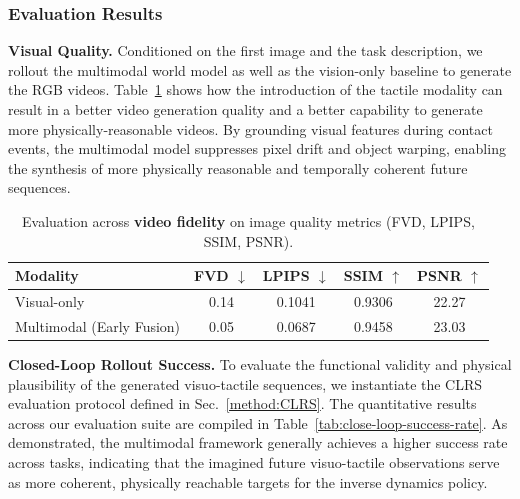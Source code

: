 \documentclass{article}
\begin{document}
\subsubsection{Evaluation Results}

\textbf{Visual Quality.} Conditioned on the first image and the task description, we rollout the multimodal world model as well as the vision-only baseline to generate the RGB videos. Table~\ref{tab:visual-quality} shows how the introduction of the tactile modality can result in a better video generation quality and a better capability to generate more physically-reasonable videos. By grounding visual features during contact events, the multimodal model suppresses pixel drift and object warping, enabling the synthesis of more physically reasonable and temporally coherent future sequences.

\begin{table}[h]
    \centering
    \caption{\small Evaluation across \textbf{video fidelity} on image quality metrics (FVD, LPIPS, SSIM, PSNR).}
    \vspace{0.5em}
    \small
    \begin{tabular}{lcccc}
        \hline
        \textbf{Modality} & \textbf{FVD} $\downarrow$ & \textbf{LPIPS} $\downarrow$ & \textbf{SSIM} $\uparrow$ & \textbf{PSNR} $\uparrow$  \\
        \hline
        Visual-only       & 0.14 & 0.1041  & 0.9306 & 22.27 \\
        Multimodal (Early Fusion)   & 0.05 & 0.0687  & 0.9458 & 23.03 \\
        \hline
    \end{tabular}
    \label{tab:visual-quality}
\end{table}

\textbf{Closed-Loop Rollout Success.} To evaluate the functional validity and physical plausibility of the generated visuo-tactile sequences, we instantiate the CLRS evaluation protocol defined in Sec.~\ref{method:CLRS}. The quantitative results across our evaluation suite are compiled in Table~\ref{tab:close-loop-success-rate}. As demonstrated, the multimodal framework generally achieves a higher success rate across tasks, indicating that the imagined future visuo-tactile observations serve as more coherent, physically reachable targets for the inverse dynamics policy.
\end{document}
